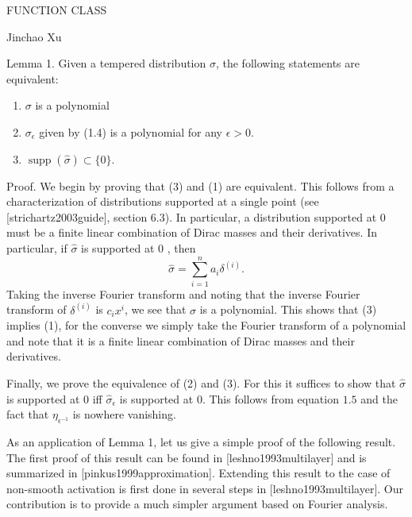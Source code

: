 \documentclass[10pt]{article}
\begin{document}
FUNCTION CLASS

Jinchao $\mathrm{Xu}$

Lemma 1. Given a tempered distribution $\sigma$, the following statements are equivalent:

    \begin{enumerate}
      \item $\sigma$ is a polynomial

      \item $\sigma_{\epsilon}$ given by (1.4) is a polynomial for any $\epsilon>0$.

      \item $\operatorname{supp}(\hat{\sigma}) \subset\{0\}$.

    \end{enumerate}
Proof. We begin by proving that (3) and (1) are equivalent. This follows from a characterization of distributions supported at a single point (see [strichartz2003guide], section 6.3). In particular, a distribution supported at 0 must be a finite linear combination of Dirac masses and their derivatives. In particular, if $\hat{\sigma}$ is supported at 0 , then
$$
\hat{\sigma}=\sum_{i=1}^{n} a_{i} \delta^{(i)} .
$$
Taking the inverse Fourier transform and noting that the inverse Fourier transform of $\delta^{(i)}$ is $c_{i} x^{i}$, we see that $\sigma$ is a polynomial. This shows that (3) implies (1), for the converse we simply take the Fourier transform of a polynomial and note that it is a finite linear combination of Dirac masses and their derivatives.

Finally, we prove the equivalence of (2) and (3). For this it suffices to show that $\hat{\sigma}$ is supported at 0 iff $\hat{\sigma}_{\epsilon}$ is supported at $0 .$ This follows from equation $1.5$ and the fact that $\eta_{\epsilon^{-1}}$ is nowhere vanishing.

As an application of Lemma 1, let us give a simple proof of the following result. The first proof of this result can be found in [leshno1993multilayer] and is summarized in [pinkus1999approximation]. Extending this result to the case of non-smooth activation is first done in several steps in [leshno1993multilayer]. Our contribution is to provide a much simpler argument based on Fourier analysis.
\end{document}
